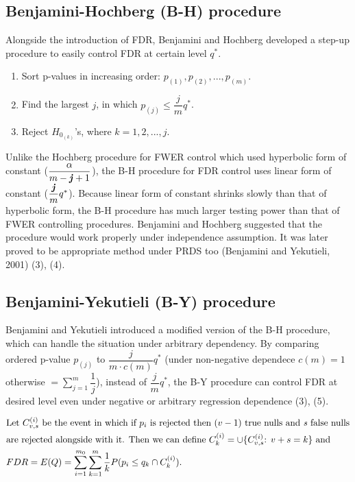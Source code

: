 \documentclass[a4paper, 11pt, oneside]{article}
\begin{document}
\subsection{Benjamini-Hochberg (B-H) procedure}
Alongside the introduction of FDR, Benjamini and Hochberg developed a step-up procedure to easily control FDR at certain level $q^*$.
\begin{enumerate}
  \item Sort p-values in increasing order: $p_{(1)}, p_{(2)}, ..., p_{(m)}$.
  \item Find the largest $j$, in which $p_{(j)} \leq \dfrac{j}{m}q^*$.
  \item Reject $H_{0_{(k)}}$'s, where $k=1, 2, ..., j$.
\end{enumerate}
Unlike the Hochberg procedure for FWER control which used hyperbolic form of constant ($\dfrac{\alpha}{m-\textbf{\textit{j}}+1}$), the B-H procedure for FDR control uses linear form of constant ($\dfrac{\textbf{\textit{j}}}{m}q^*$). Because linear form of constant shrinks slowly than that of hyperbolic form, the B-H procedure has much larger testing power than that of FWER controlling procedures. Benjamini and Hochberg suggested that the procedure would work properly under independence assumption. It was later proved to be appropriate method under PRDS too (Benjamini and Yekutieli, 2001) (3), (4).


\subsection{Benjamini-Yekutieli (B-Y) procedure}
Benjamini and Yekutieli introduced a modified version of the B-H procedure, which can handle the situation under arbitrary dependency. By comparing ordered p-value $p_{(j)}$ to $\dfrac{j}{m \cdot c(m)}q^*$ (under non-negative dependece $c(m)=1$ otherwise $=\sum_{j=1}^m \dfrac{1}{j}$), instead of $\dfrac{j}{m}q^*$, the B-Y procedure can control FDR at desired level even under negative or arbitrary regression dependence (3), (5).

\begin{equation}
\begin{aligned}\label{proof-by1}
& \text{Let } C_{v, s}^{(i)} \text{ be the event in which if } p_i \text{ is rejected then } (v-1) \text{ true nulls and \textit{s} false nulls}\\
& \text{are rejected alongside with it. Then we can define } C_k^{(i)}=\cup \{C_{v,s}^{(i)} \text{: } v+s=k \} \text{ and } \\
& FDR=E(Q)=\sum_{i=1}^{m_0} \sum_{k=1}^m \dfrac{1}{k}P(p_i \leq q_k \cap C_k^{(i)}).\\
\end{aligned}
\end{equation}
\end{document}
